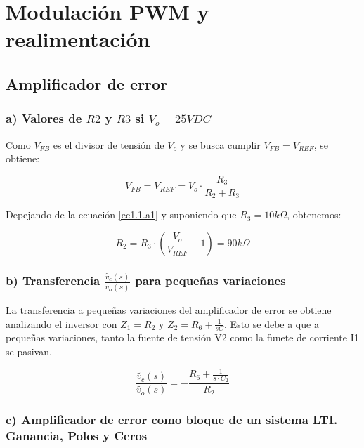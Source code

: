 \documentclass[e4_tp2_main.tex]{subfiles}
\begin{document}

\section{Modulación PWM y realimentación}

\subsection{Amplificador de error}

\subsubsection*{a) Valores de $R2$ y $R3$ si $V_o=25 VDC$}

Como $V_{FB}$ es el divisor de tensi\'on de $V_o$ y se busca cumplir $V_{FB}=V_{REF}$, se obtiene:

\begin{equation}
V_{FB}=V_{REF}= V_o \cdot \frac{R_3}{R_2+R_3} 
\label{ec1.1.a1}
\end{equation}


Depejando de la ecuaci\'on \eqref{ec1.1.a1} y suponiendo que $R_3=10k \Omega $, obtenemos:

\begin{equation}
R_2=R_3 \cdot \left( \frac{V_o}{V_{REF}} - 1 \right)=90k \Omega \label{ec1.1.a2}
\end{equation}

\subsubsection*{b) Transferencia  $\frac{ \widetilde{v_c}(s)}{\widetilde{v_o}(s)}$ para pequeñas variaciones} 

La transferencia a pequeñas variaciones del amplificador de error se obtiene analizando el inversor con $Z_1=R_2$ y $Z_2=R_6 + \frac{1}{sC}$. Esto se debe a que a pequeñas variaciones, tanto la fuente de tensi\'on V2 como la funete de corriente I1 se pasivan.

\begin{equation}
\frac{\widetilde{v_c}(s)}{\widetilde{v_o}(s)}=-\frac{R_6 + \frac{1}{s \cdot C_2} }{R_2}  \label{ec1.1.b}
\end{equation}

\subsubsection*{c) Amplificador de error como bloque de un sistema LTI. Ganancia, Polos y Ceros}
\end{document}
